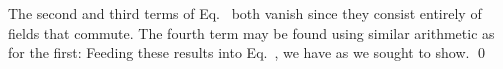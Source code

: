 {	The second and third terms of Eq.~ both vanish since they consist entirely of fields that commute.  The fourth term may be found using similar arithmetic as for the first:
	Feeding these results into Eq.~, we have
	as we sought to show. \qed
	
}